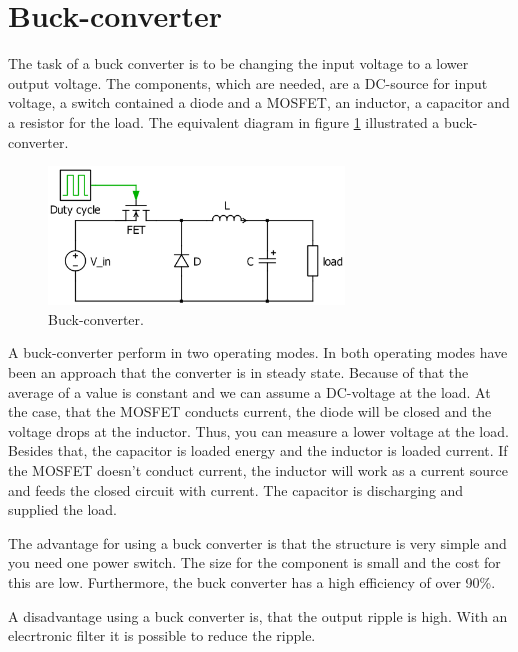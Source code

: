 \section{Buck-converter\label{Buck-C}}

The task of a buck converter is to be changing the input voltage to a lower output voltage. The components, which are needed, are a DC-source for input voltage, a switch contained a diode and a MOSFET, an inductor, a capacitor and a resistor for the load. The equivalent diagram in figure \ref{Buck-converter} illustrated a buck-converter.%

\begin{figure}[htbp]
	\begin{center}
		\includegraphics[width=0.7\textwidth]{../Pictures/Buck-converter}
		\caption{Buck-converter.}
		\label{Buck-converter}
	\end{center}	
\end{figure}

A buck-converter perform in two operating modes. In both operating modes have been an approach that the converter is in steady state. Because of that the average of a value is constant and we can assume a DC-voltage at the load. At the case, that the MOSFET conducts current, the diode will be closed and the voltage drops at the inductor. Thus,  you can measure a lower voltage at the load. Besides that, the capacitor is loaded energy and the inductor is loaded current. If the MOSFET doesn't conduct current, the inductor will work as a current source and feeds the closed circuit with current. The capacitor is discharging and supplied the load.

The advantage for using a buck converter is that the structure is very simple and you need one power switch. The size for the component is small and the cost for this are low. Furthermore, the buck converter has a high efficiency of over 90\%.%

A disadvantage using a buck converter is, that the output ripple is high. With an elecrtronic filter it is possible to reduce the ripple.

